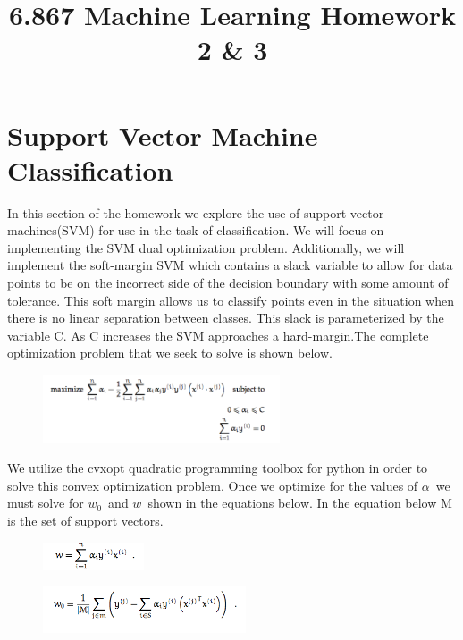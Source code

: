 \documentclass[pageno]{jpaper}
\begin{document}
\title{6.867 Machine Learning Homework 2 \& 3}
\date{}
\maketitle

\thispagestyle{empty}


\section{Support Vector Machine Classification}
In this section of the homework we explore the use of support vector machines(SVM) for use in the task of classification. We will focus on implementing the SVM dual optimization problem. Additionally, we will implement the soft-margin SVM which contains a slack variable to allow for data points to be on the incorrect side of the decision boundary with some amount of tolerance. This soft margin allows us to classify points even in the situation when there is no linear separation between classes. This slack is parameterized by the variable C. As C increases the SVM approaches a hard-margin.The complete optimization problem that we seek to solve is shown below.
\begin{figure}[ht!]
\centering
\includegraphics[width=70mm]{svm_dual_soft}
\end{figure}

We utilize the cvxopt quadratic programming toolbox for python in order to solve this convex optimization problem.
Once we optimize for the values of $\alpha$\ we must solve for $w_0$\ and $w$\, shown in the equations below. In the equation below M is the set of support vectors.

\begin{figure}[ht!]
\centering
\includegraphics[width=30mm]{w}
\end{figure}

\begin{figure}[ht!]
\centering
\includegraphics[width=60mm]{W_0}
\end{figure}
\end{document}

